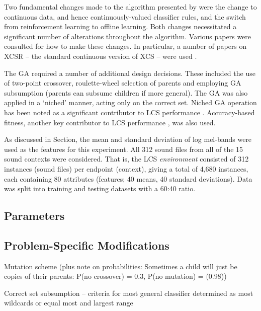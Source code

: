\documentclass[11pt]{article}
\begin{document}
\begin{multicols}{2}
Two fundamental changes made to the algorithm presented by \citeauthor{Butz2000} were the change to continuous data, and hence continuously-valued classifier rules, and the switch from reinforcement learning to offline learning. Both changes necessitated a significant number of alterations throughout the algorithm. Various papers were consulted for how to make these changes. In particular, a number of papers on XCSR -- the standard continuous version of XCS -- were used \cite{Sowden2007,Stone2003,Wilson2000,Behdad2012}.

The GA required a number of additional design decisions. These included the use of two-point crossover, roulette-wheel selection of parents and employing GA subsumption (parents can subsume children if more general). The GA was also applied in a `niched' manner, acting only on the correct set. Niched GA operation has been noted as a significant contributor to LCS performance \cite{Lanzi2008}. Accuracy-based fitness, another key contributor to LCS performance \cite{Lanzi2008}, was also used.

As discussed in Section, the mean and standard deviation of log mel-bands were used as the features for this experiment. All 312 sound files from all of the 15 sound contexts were considered. That is, the LCS \textit{environment} consisted of 312 instances (sound files) per endpoint (context), giving a total of 4,680 instances, each containing 80 attributes (features; 40 means, 40 standard deviations). Data was split into training and testing datasets with a 60:40 ratio.







\subsection{Parameters}
\label{sec:exp2params}



\subsection{Problem-Specific Modifications}
\label{sec:exp2mods}


Mutation scheme (plus note on probabilities: Sometimes a child will just be copies of their parents: P(no crossover) = 0.3, P(no mutation) = (0.98))

Correct set subsumption -- criteria for most general classifier determined as most wildcards or equal most and largest range


\end{multicols}
\end{document}
